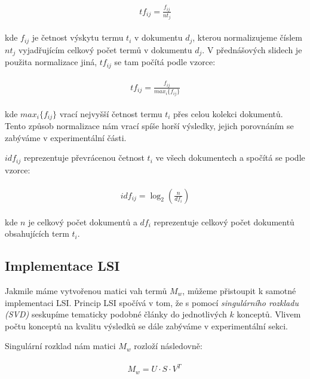 \documentclass[11pt]{scrartcl} %
\begin{document}
\begin{align}
	\begin{split}
		tf_{ij} = \frac{f_{ij}}{nt_j}
	\end{split}					
\end{align}

kde $f_{ij}$ je četnost výskytu termu $t_i$ v dokumentu $d_j$, kterou normalizujeme číslem $nt_j$ vyjadřujícím celkový počet termů v dokumentu $d_j$. V přednášových slidech je použita normalizace jiná, $tf_{ij}$ se tam počítá podle vzorce:

\begin{align}
	\begin{split}
		tf_{ij} = \frac{f_{ij}}{max_i\{f_{ij}\}}
	\end{split}					
\end{align}

kde $max_i\{f_{ij}\}$ vrací nejvyšší četnost termu $t_i$ přes celou kolekci dokumentů. Tento způsob normalizace nám vrací spíše horší výsledky, jejich porovnáním se zabýváme v experimentální části.

$idf_{ij}$ reprezentuje převrácenou četnost $t_i$ ve všech dokumentech a spočítá se podle vzorce:

\begin{align}
	\begin{split}
		idf_{ij} = \log_2 (\frac{n}{df_i})
	\end{split}					
\end{align}

kde $n$ je celkový počet dokumentů a $df_i$ reprezentuje celkový počet dokumentů obsahujících term $t_i$.

\subsection{Implementace LSI}

Jakmile máme vytvořenou matici vah termů $M_w$, můžeme přistoupit k samotné implementaci LSI. Princip LSI spočívá v tom, že s pomocí \emph{singulárního rozkladu (SVD)} seskupíme tematicky podobné články do jednotlivých $k$ konceptů. Vlivem počtu konceptů na kvalitu výsledků se dále zabýváme v experimentální sekci.

\bigskip 

Singulární rozklad nám matici $M_w$ rozloží následovně:

\begin{align}
	\begin{split}
		M_w = U \cdot S \cdot V^T
	\end{split}					
\label{eq:svd}\
\end{align}
\end{document}
